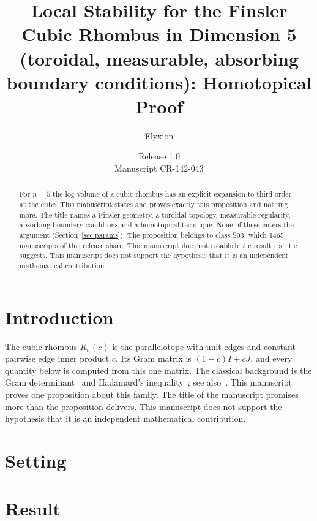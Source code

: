 \documentclass[11pt]{article}
\title{Local Stability for the Finsler Cubic Rhombus in Dimension 5 (toroidal, measurable, absorbing boundary conditions): Homotopical Proof}
\author{Flyxion}
\date{Release 1.0\\ Manuscript CR-142-043}
\begin{document}
\maketitle
\begin{abstract}
For $n=5$ the log volume of a cubic rhombus has an explicit expansion to third order at the cube. This manuscript states and proves exactly this proposition and nothing more. The title names a Finsler geometry, a toroidal topology, measurable regularity, absorbing boundary conditions and a homotopical technique. None of these enters the argument (Section~\ref{sec:params}). The proposition belongs to class S03, which 1465 manuscripts of this release share. This manuscript does not establish the result its title suggests. This manuscript does not support the hypothesis that it is an independent mathematical contribution.
\end{abstract}

\section{Introduction}
The cubic rhombus $R_n(c)$ is the parallelotope with unit edges and constant pairwise edge inner product $c$. Its Gram matrix is $(1-c)I+cJ$, and every quantity below is computed from this one matrix. The classical background is the Gram determinant~\cite{gram} and Hadamard's inequality~\cite{hadamard}; see also~\cite{hj}.
This manuscript proves one proposition about this family. The title of the manuscript promises more than the proposition delivers. This manuscript does not support the hypothesis that it is an independent mathematical contribution.

\section{Setting}


\section{Result}

\end{document}
